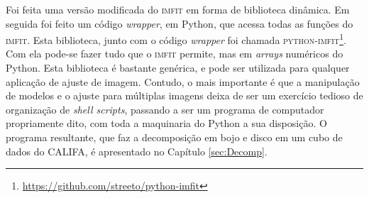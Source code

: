 Foi feita uma versão modificada do \textsc{imfit} em forma de biblioteca
dinâmica. Em seguida foi feito um código {\em wrapper}, em Python, que acessa
todas as funções do \textsc{imfit}. Esta biblioteca, junto com o código {\em
wrapper} foi chamada
\textsc{python-imfit}\footnote{\url{https://github.com/streeto/python-imfit}}.
Com ela pode-se fazer tudo que o \textsc{imfit} permite, mas em {\em arrays}
numéricos do Python.
Esta biblioteca é bastante genérica, e pode ser utilizada para qualquer
aplicação de ajuste de imagem. Contudo, o mais importante é que a manipulação de
modelos e o ajuste para múltiplas imagens deixa de ser um exercício tedioso de
organização de {\em shell scripts}, passando a ser um programa de computador
propriamente dito, com toda a maquinaria do Python a sua disposição.
O programa resultante, que faz a decomposição em bojo e disco em um cubo de
dados do CALIFA, é apresentado no Capítulo \ref{sec:Decomp}.

%

